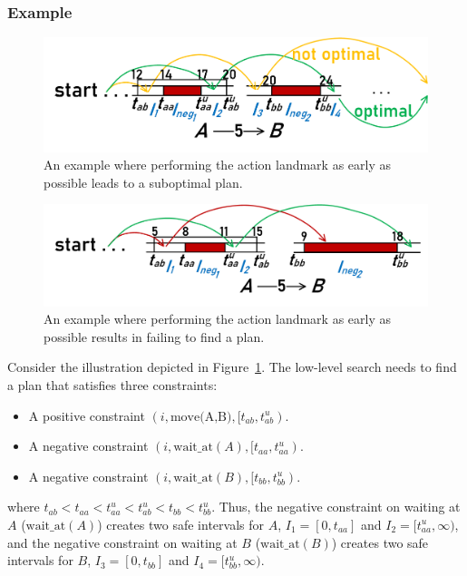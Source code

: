 \documentclass[letterpaper]{article} %
\newcommand{\ccbs}{\ac{CCBS}\xspace}
\newcommand{\ccbsds}{\ac{CCBS-DS}\xspace}
\newcommand{\cbsds}{{CBS-DS}\xspace}
\newcommand{\ds}{\ac{DS}\xspace}
\begin{document}

\subsubsection{Example}


\begin{figure}
    \centering
    \includegraphics[width=0.9\columnwidth]{Example_diff_starts.png}
    \caption{An example where performing the action landmark as early as possible leads to a suboptimal plan.}
    \label{fig:early_plan_not_optimal}
\end{figure}
\begin{figure}
    \centering
    \includegraphics[width=0.9\columnwidth]{Example_diff_goals.png}
    \caption{An example where performing the action landmark as early as possible results in failing to find a plan.}
    \label{fig:early_plan_not_complete}
\end{figure}
Consider the illustration depicted in Figure~\ref{fig:early_plan_not_optimal}. 
The low-level search needs to find a plan that satisfies three constraints: 
\begin{itemize}
    \item A positive constraint $(i, \text{move(A,B)}, [t_{ab}, t_{ab}^u)$. 
    \item A negative constraint $(i, \text{wait\_at}(A), [t_{aa}, t_{aa}^u)$.
    \item A negative constraint $(i, \text{wait\_at}(B), [t_{bb}, t_{bb}^u)$.
\end{itemize}
where $t_{ab} < t_{aa} < t_{aa}^u < t_{ab}^u <t_{bb} < t_{bb}^u$. 
Thus, the negative constraint on waiting at $A$ ($\text{wait\_at}(A)$) creates two safe intervals for $A$,  $I_1=[0,t_{aa}]$ and $I_2=[t_{aa}^u,\infty)$, 
and the negative constraint on waiting at $B$ ($\text{wait\_at}(B)$) creates two safe intervals for $B$,  
$I_3=[0,t_{bb}]$ and $I_4=[t_{bb}^u,\infty)$. 
\end{document}
